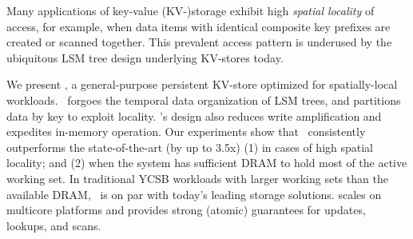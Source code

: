 Many applications of key-value (KV-)storage exhibit high \emph{spatial locality}
of access, for example, when data items with identical composite key prefixes are created or scanned together.  
This prevalent access pattern is underused by the ubiquitous LSM tree design underlying KV-stores today.

We present \sys, a general-purpose persistent KV-store optimized for spatially-local workloads. 
\sys\ forgoes the temporal data organization of LSM trees, and partitions data by key to exploit locality. 
%
\sys's design also reduces write amplification and expedites in-memory operation.
Our experiments show that \sys\ consistently outperforms the state-of-the-art (by up to 3.5x)
(1)  in cases of high spatial locality; and (2) when the system has sufficient DRAM to hold most of the active working set. 
In traditional YCSB workloads with larger working sets than the available  DRAM, \sys\ is on par with 
today's leading storage solutions.
\sys\/ scales on multicore platforms and provides strong (atomic) guarantees for updates, lookups, and scans. 
